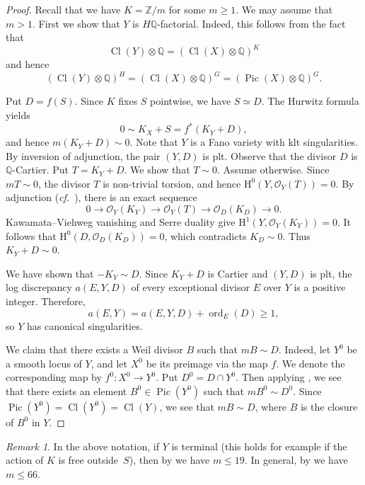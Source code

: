 \documentclass[11pt]{amsart}
\numberwithin{equation}{section}
\theoremstyle{definition}
\theoremstyle{remark}
\newtheorem{remark}[thm]{Remark}
\newcommand{\OOO}{\mathscr{O}}
\newcommand{\lra}{\longrightarrow}
\DeclareMathOperator{\Cl}{Cl}
\DeclareMathOperator{\Pic}{Pic}
\begin{document}
\begin{proof}
Recall that we have $K=\mathbb{Z}/m$ for some $m\geq 1$. We may assume that $m>1$. 
First we show that $Y$ is $H\mathbb{Q}$-factorial. Indeed, this follows from the fact that
\[
\Cl(Y)\otimes\mathbb{Q} = (\Cl(X)\otimes\mathbb{Q})^{K}
\]
and hence 
\[
(\Cl(Y)\otimes\mathbb{Q})^{H} = (\Cl(X)\otimes\mathbb{Q})^{G} = (\Pic(X)\otimes\mathbb{Q})^{G}.
\]

Put $D=f(S)$. Since $K$ fixes $S$ pointwise, we have $S\simeq D$. The Hurwitz formula yields
\[
0\sim K_X + S = f^*( K_Y + D ),
\]
and hence $m(K_Y + D)\sim 0$. Note that $Y$ is a Fano variety with klt singularities. By inversion of adjunction, the pair $(Y,D)$ is plt. Observe that the divisor $D$ is $\mathbb{Q}$-Cartier.
Put $T=K_Y+D$. We show that $T\sim0$. Assume otherwise. Since $mT\sim0$, the divisor $T$ is non-trivial torsion, and hence $\mathrm H^0(Y,\OOO_Y(T))=0$. By adjunction (\textit{cf.}~\cite[Corollary~5.25]{KM98}), there is an exact sequence
\[
0\lra\OOO_Y(K_Y)\lra\OOO_Y(T)\lra\OOO_D(K_D)\lra0.
\]
Kawamata--Viehweg vanishing and Serre duality give $\mathrm H^1(Y,\OOO_Y(K_Y))=0$. It follows that $\mathrm H^0(D,\OOO_D(K_D))=0$, which contradicts $K_D\sim0$. Thus $K_Y+D\sim0$.

We have shown that $-K_Y\sim D$. Since $K_Y+D$ is Cartier and $(Y,D)$ is plt, the log discrepancy $a(E,Y,D)$ of every exceptional divisor $E$ over $Y$ is a positive integer. Therefore,
\[
a(E,Y)=a(E,Y,D)+\operatorname{ord}_E(D)\geq1,
\]
so $Y$ has canonical singularities.
 
We claim that there exists a Weil divisor $B$ such that $mB\sim D$. Indeed, let $Y^0$ be a smooth locus of $Y$, and let $X^0$ be its preimage via the map $f$. We denote the corresponding map by $f^0\colon X^0\to Y^0$. Put $D^0=D\cap Y^0$. Then applying \cite[Theorem 1.2]{Wa68}, we see that there exists an element $B^0\in\Pic(Y^0)$ such that $mB^0\sim D^0$. Since $\Pic(Y^0)=\Cl(Y^0)=\Cl(Y)$, we see that $mB\sim D$, where $B$ is the closure of $B^0$ in $Y$. 
\end{proof}

\begin{remark}
\label{rem-bounded-index}
In the above notation, if $Y$ is terminal (this holds for example if the action of $K$ is free outside~$S$), then by \cite{Su04} we have $m\leq 19$. In general, by \cite{JL25} we have $m\leq 66$. 
\end{remark}
\end{document}
